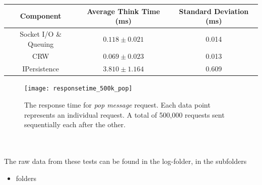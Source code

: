 \documentclass{article}
\begin{document}
                \begin{table}[H]
                    \begin{tabular}{|c|c|c|}
                        \hline 
                        \textbf{Component} & \textbf{Average Think Time} (ms)  & \textbf{Standard Deviation (ms)} \\ 
                        \hline 
                        Socket I/O \& Queuing & $0.118\pm0.021$ &0.014 \\ 
                        \hline 
                        CRW & $0.069\pm0.023$ &0.013 \\ 
                        \hline 
                        IPersistence & $3.810\pm1.164$ &0.609 \\ 
                        \hline 
                    \end{tabular}
                \end{table}
                
                \begin{figure}[H]
                    \texttt{[image: responsetime\_500k\_pop]}
                    \caption{The response time for \textit{pop message} request. Each data point represents an individual request. A total of 500,000 requests sent sequentially each after the other.}
                    \label{fig:responsetime_500k_pop}
                \end{figure}                
                ~\\
                \\
                The raw data from these tests can be found in the log-folder, in the subfolders
                \begin{itemize}
                    \item folders
                \end{itemize}               
                
\end{document}
